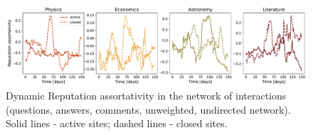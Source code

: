 \begin{figure}[h!]
	\centering
	\includegraphics[width=1\linewidth]{figures/stackexchange/reputation_assortativity.pdf}
	\caption{Dynamic Reputation assortativity in the network of interactions (questions, answers, comments, unweighted, undirected network). Solid lines - active sites; dashed lines - closed sites.}
	\label{fig:dyn_rep_assort}
\end{figure}



